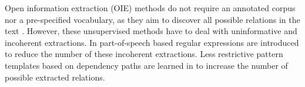 Open information extraction (OIE) methods do not require an annotated corpus nor a pre-specified vocabulary, as they aim to discover all possible relations in the text \citep{Banko2007}.
However, these unsupervised methods have to deal with uninformative and incoherent extractions. In \citep{Fader2011} part-of-speech based regular expressions are introduced to reduce the number of these incoherent extractions. Less restrictive pattern templates based on dependency paths are learned in \citep{Mausam2012} to increase the number of possible extracted relations.
